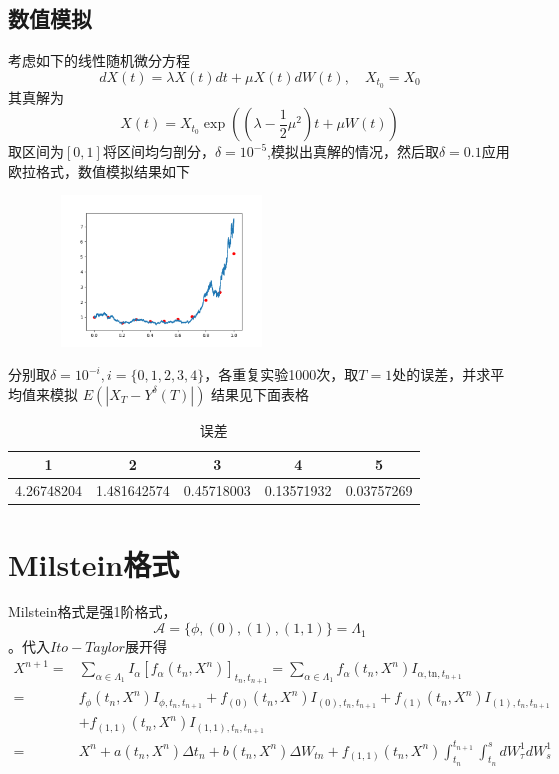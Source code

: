 \documentclass{article}%
\begin{document}
\subsection{数值模拟}
考虑如下的线性随机微分方程
\begin{equation}d X(t)=\lambda X(t) d t+\mu X(t) d W(t), \quad X_{t_0}=X_{0}\end{equation}
其真解为
\begin{equation}X(t)=X_{t_0} \exp \left(\left(\lambda-\frac{1}{2} \mu^{2}\right) t+\mu W(t)\right)\end{equation}
取区间为$[0,1]$将区间均匀剖分，$\delta=10^{-5}$,模拟出真解的情况，然后取$\delta=0.1$应用欧拉格式，数值模拟结果如下
\begin{figure}[h]
	\centering
	\includegraphics[width=6cm,height=4cm]{Figure_1.png}\\
	\centering	
\end{figure}
分别取$\delta=10^{-i},i=\{0,1,2,3,4\}$，各重复实验1000次，取$T=1$处的误差，并求平均值来模拟
$E\left(\left|X_{T}-Y^{\delta}(T)\right|\right)$
结果见下面表格
\begin{table}[htbp]
	\centering
	\caption{误差}
	\begin{tabular}{ccccc}
		\toprule  %
		1&2&3&4&5 \\ 
		\midrule  %
		4.26748204&1.481642574&0.45718003&0.13571932&0.03757269 \\
		\bottomrule  %
	\end{tabular}
\end{table}
\section{Milstein格式}
Milstein格式是强1阶格式，\begin{equation}\mathcal{A}=\{\phi,(0),(1),(1,1)\}=\Lambda_{1}\end{equation}。代入$Ito-Taylor$展开得
\begin{equation}\begin{aligned}
X^{n+1}=& \sum_{\alpha \in \Lambda_{1}} I_{\alpha}\left[f_{\alpha}\left(t_{n}, X^{n}\right)\right]_{t_{n}, t_{n+1}}=\sum_{\alpha \in \Lambda_{1}} f_{\alpha}\left(t_{n}, X^{n}\right) I_{\alpha, \text {tn}, t_{n+1}} \\
=& f_{\phi}\left(t_{n}, X^{n}\right) I_{\phi, t_{n}, t_{n+1}}+f_{(0)}\left(t_{n}, X^{n}\right) I_{(0), t_{n}, t_{n+1}}+f_{(1)}\left(t_{n}, X^{n}\right) I_{(1), t_{n}, t_{n+1}} \\
&+f_{(1,1)}\left(t_{n}, X^{n}\right) I_{(1,1), t_{n}, t_{n+1}} \\
=& X^{n}+a\left(t_{n}, X^{n}\right) \Delta t_{n}+b\left(t_{n}, X^{n}\right) \Delta W_{t n}+f_{(1,1)}\left(t_{n}, X^{n}\right) \int_{t_{n}}^{t_{n+1}} \int_{t_{n}}^{s} d W_{\tau}^{1} d W_{s}^{1}
\end{aligned}\end{equation}
\end{document}
